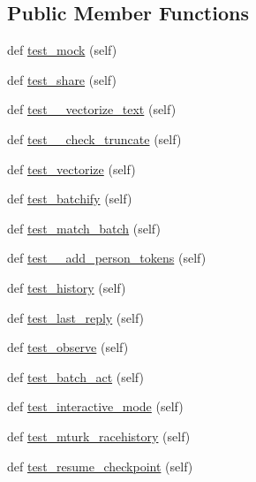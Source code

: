 \subsection*{Public Member Functions}
\begin{DoxyCompactItemize}
\item 
def \hyperlink{classtests_1_1test__torch__agent_1_1TestTorchAgent_a0a7c1df7d947bdc260afa6dad21d78b9}{test\+\_\+mock} (self)
\item 
def \hyperlink{classtests_1_1test__torch__agent_1_1TestTorchAgent_af3d1c7681a30a06684117464ccefb15d}{test\+\_\+share} (self)
\item 
def \hyperlink{classtests_1_1test__torch__agent_1_1TestTorchAgent_a9bce672782a5d1408c104fd89d2d403f}{test\+\_\+\+\_\+vectorize\+\_\+text} (self)
\item 
def \hyperlink{classtests_1_1test__torch__agent_1_1TestTorchAgent_ab5ef383cb36b970850bb3e171c832f36}{test\+\_\+\+\_\+check\+\_\+truncate} (self)
\item 
def \hyperlink{classtests_1_1test__torch__agent_1_1TestTorchAgent_a551847086a9d8bf6bc04ea1efeacf608}{test\+\_\+vectorize} (self)
\item 
def \hyperlink{classtests_1_1test__torch__agent_1_1TestTorchAgent_aad1075dad0c291b524d84ec9526177dd}{test\+\_\+batchify} (self)
\item 
def \hyperlink{classtests_1_1test__torch__agent_1_1TestTorchAgent_abe59ca8c2f6927c0ba6f0e5ce7d3a4f2}{test\+\_\+match\+\_\+batch} (self)
\item 
def \hyperlink{classtests_1_1test__torch__agent_1_1TestTorchAgent_a81c474c311d1825377b107d40d567d8a}{test\+\_\+\+\_\+add\+\_\+person\+\_\+tokens} (self)
\item 
def \hyperlink{classtests_1_1test__torch__agent_1_1TestTorchAgent_a3c5504828399a2bb0d776baf1a744f71}{test\+\_\+history} (self)
\item 
def \hyperlink{classtests_1_1test__torch__agent_1_1TestTorchAgent_a7c1c12023294608a146271f4fe1574ea}{test\+\_\+last\+\_\+reply} (self)
\item 
def \hyperlink{classtests_1_1test__torch__agent_1_1TestTorchAgent_ae3b6e4145176ba5d5e9179756d064332}{test\+\_\+observe} (self)
\item 
def \hyperlink{classtests_1_1test__torch__agent_1_1TestTorchAgent_aed82743e884c933453d912cfa8c7ec7f}{test\+\_\+batch\+\_\+act} (self)
\item 
def \hyperlink{classtests_1_1test__torch__agent_1_1TestTorchAgent_aadf263b222e27bfd83d568148683a8e0}{test\+\_\+interactive\+\_\+mode} (self)
\item 
def \hyperlink{classtests_1_1test__torch__agent_1_1TestTorchAgent_a9954f92efc8cc7a9770f90f3a297d397}{test\+\_\+mturk\+\_\+racehistory} (self)
\item 
def \hyperlink{classtests_1_1test__torch__agent_1_1TestTorchAgent_a7135ee3421b1d0fc98f0202718910482}{test\+\_\+resume\+\_\+checkpoint} (self)
\end{DoxyCompactItemize}


